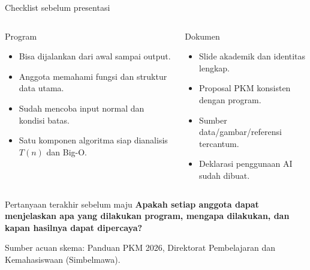 \documentclass[aspectratio=169,11pt]{beamer}
\begin{document}
\begin{frame}{Checklist sebelum presentasi}
\small
\begin{columns}[T]
\begin{block}{Program}
\begin{itemize}
  \item Bisa dijalankan dari awal sampai output.
  \item Anggota memahami fungsi dan struktur data utama.
  \item Sudah mencoba input normal dan kondisi batas.
  \item Satu komponen algoritma siap dianalisis $T(n)$ dan Big-O.
\end{itemize}
\end{block}
\begin{block}{Dokumen}
\begin{itemize}
  \item Slide akademik dan identitas lengkap.
  \item Proposal PKM konsisten dengan program.
  \item Sumber data/gambar/referensi tercantum.
  \item Deklarasi penggunaan AI sudah dibuat.
\end{itemize}
\end{block}
\end{columns}
\vspace{2mm}
\begin{alertblock}{Pertanyaan terakhir sebelum maju}
\centering
\textbf{Apakah setiap anggota dapat menjelaskan apa yang dilakukan program, mengapa dilakukan, dan kapan hasilnya dapat dipercaya?}
\end{alertblock}
\vspace{2mm}
\scriptsize Sumber acuan skema: Panduan PKM 2026, Direktorat Pembelajaran dan Kemahasiswaan (Simbelmawa).
\end{frame}
\end{document}
